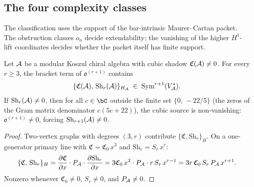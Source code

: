 \subsection{The four complexity classes}

The classification uses the support of the bar-intrinsic
Maurer--Cartan packet.  The obstruction classes \(o_n\) decide
extendability; the vanishing of the higher \(H^1\)-lift coordinates
decides whether the packet itself has finite support.

\begin{lemma}
\label{lem:thqg-cubic-source}
\ClaimStatusProvedHere
{}
Let $\mathcal{A}$ be a modular Koszul chiral algebra with cubic
shadow $\mathfrak{C}(\mathcal{A}) \neq 0$. For every $r \geq 3$,
the bracket term of $\mathfrak{o}^{(r+1)}$ contains
\begin{equation}%
\{\mathfrak{C}(\cA),\, \mathrm{Sh}_r(\cA)\}_{H_\cA}
\;\in\;
\operatorname{Sym}^{r+1}(V_\cA^*).
\end{equation}
If $\mathrm{Sh}_r(\mathcal{A}) \neq 0$, then for all $c \in \bC$
outside the finite set $\{0,\, -22/5\}$ (the zeros of the
Gram matrix denominator $c(5c+22)$), the cubic source is
non-vanishing: $\mathfrak{o}^{(r+1)} \neq 0$, forcing
$\mathrm{Sh}_{r+1}(\mathcal{A}) \neq 0$.
\end{lemma}

\begin{proof}
Two-vertex graphs with degrees $(3, r)$ contribute
$\{\mathfrak{C}, \mathrm{Sh}_r\}_H$. On a one-generator
primary line with $\mathfrak{C} = \mathfrak{C}_0\,x^3$ and
$\mathrm{Sh}_r = S_r\,x^r$:
\begin{equation}%
\{\mathfrak{C},\, \mathrm{Sh}_r\}_{H}
= \frac{\partial\mathfrak{C}}{\partial x}
 \cdot P_\cA \cdot
 \frac{\partial\mathrm{Sh}_r}{\partial x}
= 3\mathfrak{C}_0\,x^2 \cdot P_\cA \cdot r\,S_r\,x^{r-1}
= 3r\,\mathfrak{C}_0\,S_r\,P_\cA\,x^{r+1}.
\end{equation}
Nonzero whenever $\mathfrak{C}_0 \neq 0$, $S_r \neq 0$,
and $P_{\mathcal{A}} \neq 0$.
\end{proof}

